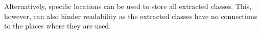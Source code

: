 Alternatively, specific locations can be used to store all extracted classes. This, however, can also hinder readability as the extracted classes have no connections to the places where they are used.  

\begin{comment}

\section{Pipeline execution example}
Listing \ref{lst:math_stuff_java} will be used as the foundation to describe a detailed approach for fixing data clumps.

Looking at the parameters \textit{x}, \textit{y}, and \textit{z}, there are multiple suggestions for a class name. The most trivial one is a simple concatenation  (e.g., \textit{XYZ} or \textit{X\_Y\_Z}). However, this name is often not suitable as it can be hard to read and to understand its meaning.

A more suitable approach requires domain knowledge. It is common knowledge that the terms \textit{x}, \textit{y}, and \textit{z} are terms used in math to describe coordinates. Using this information, a fitting name could be \textit{Coordinate}. Simple methods would not have discovered this name as artificial or human intelligence is required. 



Since a suitable class name has been found, the following class can be created using previously obtained information. 

Listing \ref{lst:coordinate_java} shows an example implementation of a coordinate class. This class contains fields, getters, and setters for all method parameters. There is also a constructor for initialization. This respects Fowler's opinion that the extracted class should not be a mere data class but a functional class that can be easily extended and modified.


\end{comment}






\hfill
